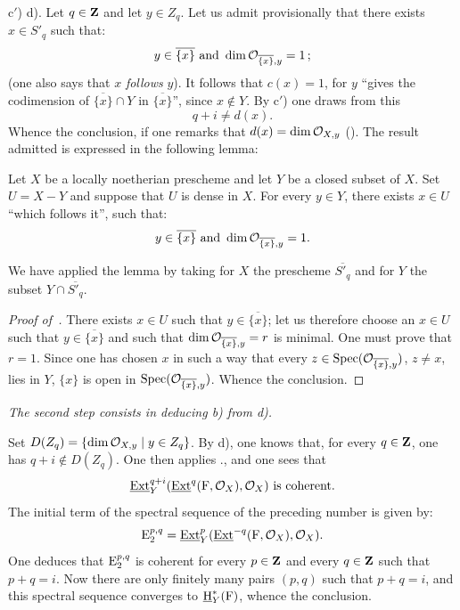 c$'$) \ALORS d). Let $q\in\mathbf{Z}$ and let $y\in Z_q$. Let us admit provisionally that there exists $x\in S'_q$ such that:
\[
y\in\overline{\{x\}}\textup{ and }\dim {\mathcal O}_{\overline{\{x\}}, y}=1\, \text{;}\]
(one also says that $x$ \emph{follows} $y$). It follows that $c(x)=1$, for $y$ ``gives the codimension of $\overline{\{x\}}\cap Y$ in $\overline{\{x\}}$'', since $x\not\in Y$. By c$'$) one draws from this
\[q+i\neq d(x).
\]
Whence the conclusion, if one remarks that $d(x)=\dim {\mathcal O}_{X, y}$ (). The result admitted is expressed in the following lemma:

\begin{lemma} \label{VIII.2.5} Let $X$ be a locally noetherian prescheme and let $Y$ be a closed subset of $X$. Set $U=X-Y$ and suppose that $U$ is dense in $X$. For every $y\in Y$, there exists $x\in U$ ``which follows it'', \ie such that:
\[y\in\overline{\{x\}}\text{ and } \dim{\mathcal O}_{\overline{\{x\}}, y}=1.
\]
\end{lemma}

We have applied the lemma by taking for $X$ the prescheme $\overline{S'_q}$ and for $Y$ the subset $Y\cap \overline{S'_q}$.

\begin{proof}[Proof of~]
There exists $x\in U$ such that $y\in\overline{\{x\}}$; let us therefore choose an $x\in U$ such that $y\in\overline{\{x\}}$ and such that $\dim {\mathcal O}_{\overline{\{x\}}, y}=r$ is minimal. One must prove that $r=1$. Since one has chosen $x$ in such a way that every $z\in\operatorname{Spec}({\mathcal O}_{\overline{\{x\}}, y})$, $z\neq x$, lies in $Y$, $\{x\}$ is open in $\operatorname{Spec}({\mathcal O}_{\overline{\{x\}}, y})$. Whence the conclusion.
\skipqed
\end{proof}

\emph{The second step consists in deducing \textup{b)} from \textup{d)}.}

\noindent Set $D(Z_q)=\{\dim {\mathcal O}_{X, y} \mid y\in Z_q\}$. By d), one knows that, for every $q\in\mathbf{Z}$, one has $q+i\not\in D(Z_q)$. One then applies ., and one sees that
\[
\operatorname{\underline{Ext}}^{q+i}_Y(\operatorname{\underline{Ext}}^q({\operatorname{F}}, \mathcal{O}_X), \mathcal{O}_X) \text{ is coherent.}\]
The initial term of the spectral sequence of the preceding number is given by:
\[
\operatorname{E}^{p, q}_2=\operatorname{\underline{Ext}}^p_Y(\operatorname{\underline{Ext}}^{-q}({\operatorname{F}}, \mathcal{O}_X), \mathcal{O}_X).
\]
One deduces that $\operatorname{E}^{p, q}_2$ is coherent for every $p\in\mathbf{Z}$ and every $q\in\mathbf{Z}$ such that $p+q=i$. Now there are only finitely many pairs $(p, q)$ such that $p+q=i$, and this spectral sequence converges to $\operatorname{\underline{H}}^\ast_Y({\operatorname{F}})$, whence the conclusion.

